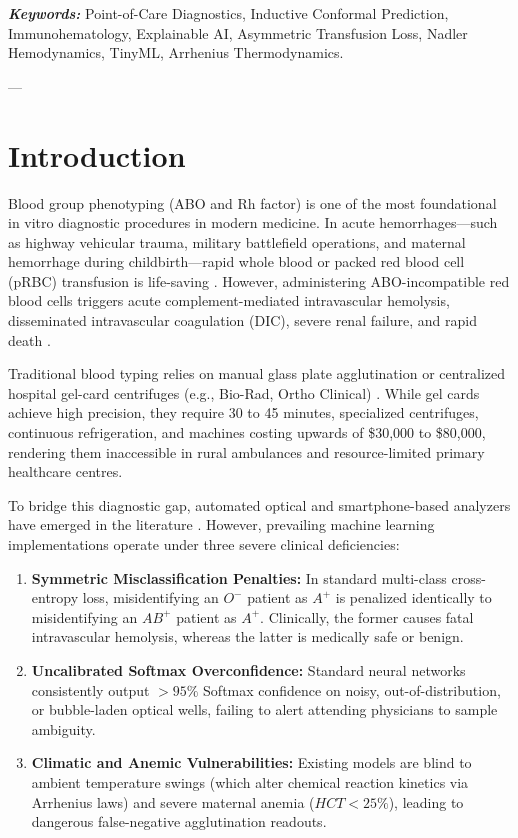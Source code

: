 \documentclass[11pt,a4paper]{article}
\begin{document}
\textbf{\textit{Keywords:}} Point-of-Care Diagnostics, Inductive Conformal Prediction, Immunohematology, Explainable AI, Asymmetric Transfusion Loss, Nadler Hemodynamics, TinyML, Arrhenius Thermodynamics.

---

\section{Introduction}
Blood group phenotyping (ABO and Rh factor) is one of the most foundational in vitro diagnostic procedures in modern medicine. In acute hemorrhages---such as highway vehicular trauma, military battlefield operations, and maternal hemorrhage during childbirth---rapid whole blood or packed red blood cell (pRBC) transfusion is life-saving \cite{harmening2012modern}. However, administering ABO-incompatible red blood cells triggers acute complement-mediated intravascular hemolysis, disseminated intravascular coagulation (DIC), severe renal failure, and rapid death \cite{davenport2005pathophysiology}.

Traditional blood typing relies on manual glass plate agglutination or centralized hospital gel-card centrifuges (e.g., Bio-Rad, Ortho Clinical) \cite{ballerini2012paper}. While gel cards achieve high precision, they require 30 to 45 minutes, specialized centrifuges, continuous refrigeration, and machines costing upwards of \$30,000 to \$80,000, rendering them inaccessible in rural ambulances and resource-limited primary healthcare centres. 

To bridge this diagnostic gap, automated optical and smartphone-based analyzers have emerged in the literature \cite{shen2012paper, djamel2025abo}. However, prevailing machine learning implementations operate under three severe clinical deficiencies:
\begin{enumerate}
    \item \textbf{Symmetric Misclassification Penalties:} In standard multi-class cross-entropy loss, misidentifying an $O^-$ patient as $A^+$ is penalized identically to misidentifying an $AB^+$ patient as $A^+$. Clinically, the former causes fatal intravascular hemolysis, whereas the latter is medically safe or benign.
    \item \textbf{Uncalibrated Softmax Overconfidence:} Standard neural networks consistently output $>95\%$ Softmax confidence on noisy, out-of-distribution, or bubble-laden optical wells, failing to alert attending physicians to sample ambiguity.
    \item \textbf{Climatic and Anemic Vulnerabilities:} Existing models are blind to ambient temperature swings (which alter chemical reaction kinetics via Arrhenius laws) and severe maternal anemia ($HCT < 25\%$), leading to dangerous false-negative agglutination readouts.
\end{enumerate}
\end{document}
